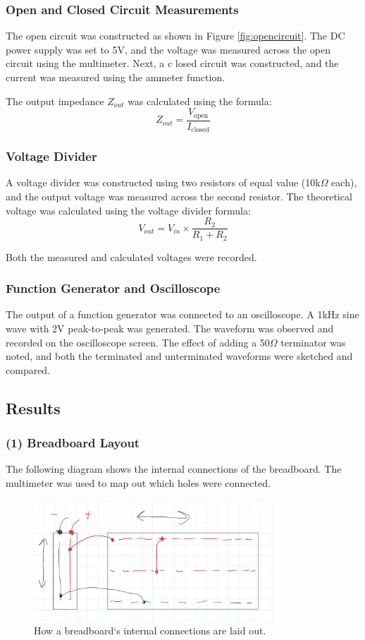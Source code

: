 \documentclass{article}
\begin{document}
\subsubsection{Open and Closed Circuit Measurements}
The open circuit was constructed as shown in Figure \ref{fig:opencircuit}. The DC power supply 
was set to 5V, and the voltage was measured across the open circuit using the multimeter. Next, a c
losed circuit was constructed, and the current was measured using the ammeter function.


The output impedance $Z_{out}$ was calculated using the formula:
\[
Z_{out} = \frac{V_{\text{open}}}{I_{\text{closed}}}
\]

\subsubsection{Voltage Divider}
A voltage divider was constructed using two resistors of equal value (10k$\Omega$ each), and the output voltage was measured across the second resistor. The theoretical voltage was calculated using the voltage divider formula:
\[
V_{out} = V_{in} \times \frac{R_2}{R_1 + R_2}
\]

Both the measured and calculated voltages were recorded.

\subsubsection{Function Generator and Oscilloscope}
The output of a function generator was connected to an oscilloscope. 
A 1kHz sine wave with 2V peak-to-peak was generated. The waveform was observed and 
recorded on the oscilloscope screen. The effect of adding a 50$\Omega$ terminator was 
noted, and both the terminated and unterminated waveforms were sketched and compared.

\subsection{Results}
    \subsubsection{(1) Breadboard Layout}
    The following diagram shows the internal connections of the breadboard. The multimeter was used 
    to map out which holes were connected.

    \begin{figure}[H]
        \centering
        \includegraphics[width=0.8\textwidth]{img/Lab1_1.png} %
        \caption{How a breadboard`s internal connections are laid out.}
        \label{fig:breadboard_layout}
    \end{figure}
\end{document}
